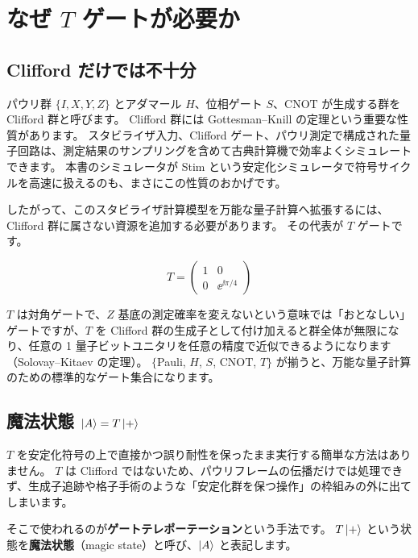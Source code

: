 \section{なぜ \texorpdfstring{$T$}{T} ゲートが必要か}\label{sec:why_t}

\subsection{Clifford だけでは不十分}

パウリ群 $\{I,X,Y,Z\}$ とアダマール $H$、位相ゲート $S$、$\mathrm{CNOT}$ が生成する群を Clifford 群と呼びます。
Clifford 群には Gottesman--Knill の定理という重要な性質があります。
スタビライザ入力、Clifford ゲート、パウリ測定で構成された量子回路は、測定結果のサンプリングを含めて古典計算機で効率よくシミュレートできます\cite{aaronson2004stabilizer}。
本書のシミュレータが Stim という安定化シミュレータで符号サイクルを高速に扱えるのも、まさにこの性質のおかげです。

したがって、このスタビライザ計算模型を万能な量子計算へ拡張するには、Clifford 群に属さない資源を追加する必要があります。
その代表が $T$ ゲートです。

\begin{equation}
  T = \begin{pmatrix} 1 & 0 \\ 0 & \ee^{\ii\pi/4} \end{pmatrix}
\end{equation}

$T$ は対角ゲートで、$Z$ 基底の測定確率を変えないという意味では「おとなしい」ゲートですが、$T$ を Clifford 群の生成子として付け加えると群全体が無限になり、任意の 1 量子ビットユニタリを任意の精度で近似できるようになります（Solovay--Kitaev の定理）。
$\{$Pauli, $H$, $S$, $\mathrm{CNOT}$, $T\}$ が揃うと、万能な量子計算のための標準的なゲート集合になります\cite{bravyi2005magic}。

\subsection{魔法状態 $\ket{A}=T\ket{+}$}

$T$ を安定化符号の上で直接かつ誤り耐性を保ったまま実行する簡単な方法はありません。
$T$ は Clifford ではないため、パウリフレームの伝播だけでは処理できず、生成子追跡や格子手術のような「安定化群を保つ操作」の枠組みの外に出てしまいます。

そこで使われるのが\textbf{ゲートテレポーテーション}という手法です。
$T\ket{+}$ という状態を\textbf{魔法状態}（magic state）と呼び、$\ket{A}$ と表記します。


